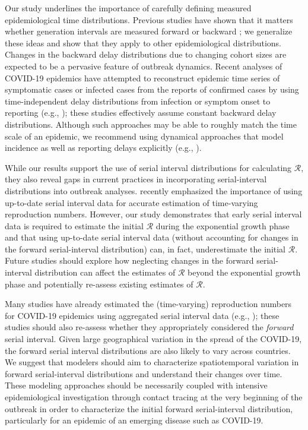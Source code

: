 \documentclass[12pt]{article}
\newcommand{\RR}{\ensuremath{{\mathcal R}}\xspace}
\begin{document}
Our study underlines the importance of carefully defining measured epidemiological time distributions.
Previous studies have shown that it matters whether generation
intervals are measured forward or backward \citep{nishiura2010time,champredon2015intrinsic,britton2019estimation};
we generalize these ideas and show that they apply to other epidemiological distributions.
Changes in the backward delay distributions due to changing cohort sizes are expected to be a pervasive feature of outbreak dynamics.
Recent analyses of COVID-19 epidemics have attempted to reconstruct epidemic time series of symptomatic cases or infected cases from the reports of confirmed cases by using time-independent delay distributions from infection or symptom onset to reporting (e.g., \cite{tempvar, park2020potential, shim2020transmission});
these studies effectively assume constant backward delay distributions.
Although such approaches may be able to roughly match the time scale of an epidemic, we recommend using dynamical approaches that model incidence as well as reporting delays explicitly (e.g., \cite{flaxman2020estimating}).

While our results support the use of serial interval distributions for calculating \RR, 
they also reveal gaps in current practices in incorporating serial-interval distributions into outbreak analyses.
\cite{thompson2019improved} recently emphasized the importance of using up-to-date serial interval data for accurate estimation of time-varying reproduction numbers.
However, our study demonstrates that early serial interval data is required to estimate the initial \RR during the exponential growth phase and that using up-to-date serial interval data (without accounting for changes in the forward serial-interval distribution) can, in fact, underestimate the initial \RR.
Future studies should explore how neglecting changes in the forward serial-interval distribution can affect the estimates of \RR beyond the exponential growth phase and potentially re-assess existing estimates of \RR.

Many studies have already estimated the (time-varying) reproduction numbers for COVID-19 epidemics using aggregated serial interval data (e.g., \cite{tempvar,du2020serial,pan2020jama,zhang2020evolving});
these studies should also re-assess whether they appropriately considered the \emph{forward} serial interval.
Given large geographical variation in the spread of the COVID-19, the forward serial interval distributions are also likely to vary across countries.
We suggest that modelers should aim to characterize spatiotemporal variation in forward serial-interval distributions and understand their changes over time.
These modeling approaches should be necessarily coupled with intensive
epidemiological investigation through contact tracing at the very
beginning of the outbreak in order to characterize the initial forward
serial-interval distribution, particularly for an epidemic of an
emerging disease such as COVID-19.
\end{document}

